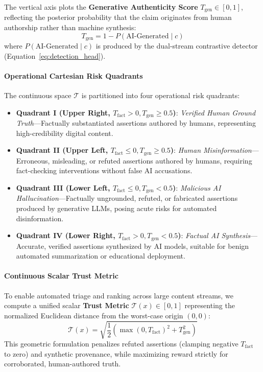The vertical axis plots the \textbf{Generative Authenticity Score} $T_{\text{gen}} \in [0, 1]$, reflecting the posterior probability that the claim originates from human authorship rather than machine synthesis:
\begin{equation}
\label{eq:trust_gen}
T_{\text{gen}} = 1 - P(\text{AI-Generated} \mid c)
\end{equation}
where $P(\text{AI-Generated} \mid c)$ is produced by the dual-stream contrastive detector (Equation~\eqref{eq:detection_head}).

\paragraph{Operational Cartesian Risk Quadrants}
The continuous space $\mathcal{T}$ is partitioned into four operational risk quadrants:
\begin{itemize}
    \item \textbf{Quadrant I (Upper Right, $T_{\text{fact}} > 0, T_{\text{gen}} \ge 0.5$)}: \textit{Verified Human Ground Truth}---Factually substantiated assertions authored by humans, representing high-credibility digital content.
    \item \textbf{Quadrant II (Upper Left, $T_{\text{fact}} \le 0, T_{\text{gen}} \ge 0.5$)}: \textit{Human Misinformation}---Erroneous, misleading, or refuted assertions authored by humans, requiring fact-checking interventions without false AI accusations.
    \item \textbf{Quadrant III (Lower Left, $T_{\text{fact}} \le 0, T_{\text{gen}} < 0.5$)}: \textit{Malicious AI Hallucination}---Factually ungrounded, refuted, or fabricated assertions produced by generative LLMs, posing acute risks for automated disinformation.
    \item \textbf{Quadrant IV (Lower Right, $T_{\text{fact}} > 0, T_{\text{gen}} < 0.5$)}: \textit{Factual AI Synthesis}---Accurate, verified assertions synthesized by AI models, suitable for benign automated summarization or educational deployment.
\end{itemize}

\paragraph{Continuous Scalar Trust Metric}
To enable automated triage and ranking across large content streams, we compute a unified scalar \textbf{Trust Metric} $\mathcal{T}(x) \in [0, 1]$ representing the normalized Euclidean distance from the worst-case origin $(0, 0)$:
\begin{equation}
\label{eq:scalar_trust_metric}
\mathcal{T}(x) = \sqrt{\frac{1}{2} \left(\max(0, T_{\text{fact}})^2 + T_{\text{gen}}^2\right)}
\end{equation}
This geometric formulation penalizes refuted assertions (clamping negative $T_{\text{fact}}$ to zero) and synthetic provenance, while maximizing reward strictly for corroborated, human-authored truth.
